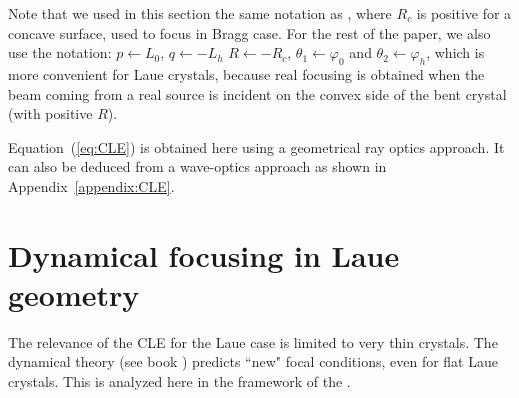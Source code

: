 \documentclass[preprint]{iucr}              %
\newcommand{\inred}[1]{{\color{red}#1}}
\begin{document}
Note that we used in this section the same notation as \cite{CK}, where $R_c$ is positive for a concave surface, used to focus in Bragg case. For the rest of the paper, we \inred{also use} the notation: $p \leftarrow L_0$, $q \leftarrow -L_h$ $R \leftarrow -R_c$, $\theta_1 \leftarrow \varphi_0$ and $\theta_2 \leftarrow \varphi_h$\inred{, which is more convenient} for Laue crystals, because real focusing is obtained when the beam coming from a real source is incident on the convex side of the bent crystal (with positive $R$).

Equation~(\ref{eq:CLE}) is obtained here using a geometrical ray optics approach. It can also be deduced from a wave-optics approach as shown in Appendix~\ref{appendix:CLE}.

\section{Dynamical focusing in Laue geometry}
\label{sec:dynamlicalLaue}

The \inred{relevance} of the CLE for the Laue case is \inred{limited to very thin crystals}. The dynamical theory \inred{(see book \cite{authierbook})}
predicts ``new" focal conditions, even for flat Laue crystals.
\inred{This is} analyzed here in the framework of the  \inred{\cite{Takagi1962, Takagi, Taupin, Taupin1967}}. 
\end{document}

